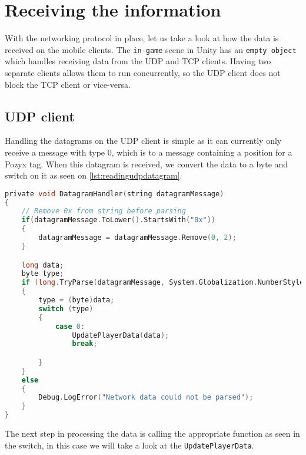 \section{Receiving the information}
With the networking protocol in place, let us take a look at how the data is received on the mobile clients.
The \texttt{in-game} scene in Unity has an \texttt{empty object} which handles receiving data from the UDP and TCP clients.
Having two separate clients allows them to run concurrently, so the UDP client does not block the TCP client or vice-versa.

\subsection*{UDP client}
Handling the datagrams on the UDP client is simple as it can currently only receive a message with type 0, which is to a message containing a position for a Pozyx tag.
When this datagram is received, we convert the data to a byte and switch on it as seen on \autoref{lst:readingudpdatagram}.

\begin{lstlisting}[caption={Processing datagrams in UDP client}, captionpos=b,language=C,label={lst:readingudpdatagram}]
private void DatagramHandler(string datagramMessage)
{
    // Remove 0x from string before parsing
    if(datagramMessage.ToLower().StartsWith("0x"))
    {
        datagramMessage = datagramMessage.Remove(0, 2);
    }

    long data;
    byte type;
    if (long.TryParse(datagramMessage, System.Globalization.NumberStyles.HexNumber, System.Globalization.CultureInfo.InvariantCulture, out data))
    {
        type = (byte)data;
        switch (type)
        {
            case 0:
                UpdatePlayerData(data);
                break;

        }
    }
    else
    {
        Debug.LogError("Network data could not be parsed");
    }
}
\end{lstlisting}

The next step in processing the data is calling the appropriate function as seen in the switch, in this case we will take a look at the \texttt{UpdatePlayerData}.

